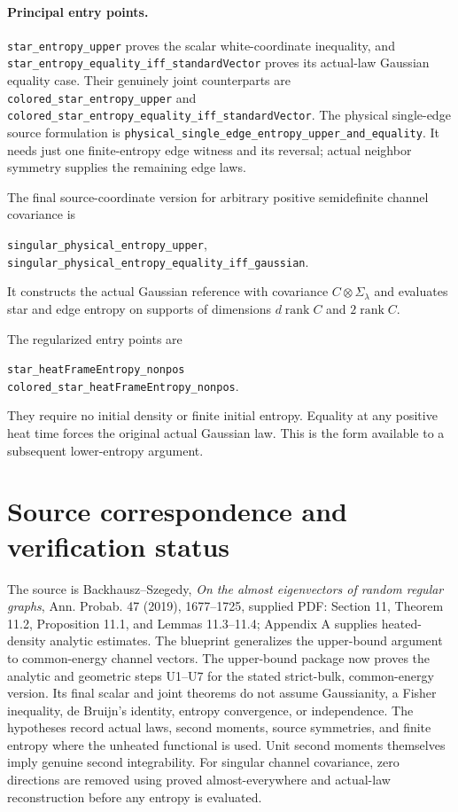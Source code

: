 \documentclass[11pt]{article}
\begin{document}
\paragraph{Principal entry points.}
\texttt{star\_entropy\_upper} proves the scalar white-coordinate inequality,
and \texttt{star\_entropy\_equality\_iff\_standardVector} proves its actual-law
Gaussian equality case. Their genuinely joint counterparts are
\texttt{colored\_star\_entropy\_upper} and
\texttt{colored\_star\_entropy\_equality\_iff\_standardVector}.
The physical single-edge source formulation is
\texttt{physical\_single\_edge\_entropy\_upper\_and\_equality}.
It needs just one finite-entropy edge witness and its reversal; actual
neighbor symmetry supplies the remaining edge laws.

The final source-coordinate version for arbitrary positive semidefinite
channel covariance is
\begin{center}\small
\texttt{singular\_physical\_entropy\_upper},\\
\texttt{singular\_physical\_entropy\_equality\_iff\_gaussian}.
\end{center}
It constructs the actual Gaussian reference with covariance
$C\otimes\Sigma_\lambda$ and evaluates star and edge entropy on supports of
dimensions $d\operatorname{rank}C$ and $2\operatorname{rank}C$.

\par\medskip\noindent\begin{minipage}{\linewidth}
The regularized entry points are
\begin{center}\small
\texttt{star\_heatFrameEntropy\_nonpos}\\
\texttt{colored\_star\_heatFrameEntropy\_nonpos}.
\end{center}
They require no initial density or finite initial entropy.
Equality at any positive heat time forces the
original actual Gaussian law. This is the form available to a subsequent
lower-entropy argument.
\end{minipage}

\section{Source correspondence and verification status}
The source is Backhausz--Szegedy, \emph{On the almost eigenvectors of random
regular graphs}, Ann. Probab. 47 (2019), 1677--1725, supplied PDF:
Section 11, Theorem 11.2, Proposition 11.1, and Lemmas 11.3--11.4;
Appendix A supplies heated-density analytic estimates. The blueprint
generalizes the upper-bound argument to common-energy channel vectors.
The upper-bound package now proves the analytic and geometric steps U1--U7
for the stated strict-bulk, common-energy version. Its final scalar and joint
theorems do not assume Gaussianity, a Fisher inequality, de Bruijn's identity,
entropy convergence, or independence. The hypotheses record actual laws,
second moments, source symmetries, and finite entropy where the unheated
functional is used. Unit second moments themselves imply genuine second
integrability. For singular channel covariance, zero directions are removed
using proved almost-everywhere and actual-law reconstruction before any
entropy is evaluated.
\end{document}
